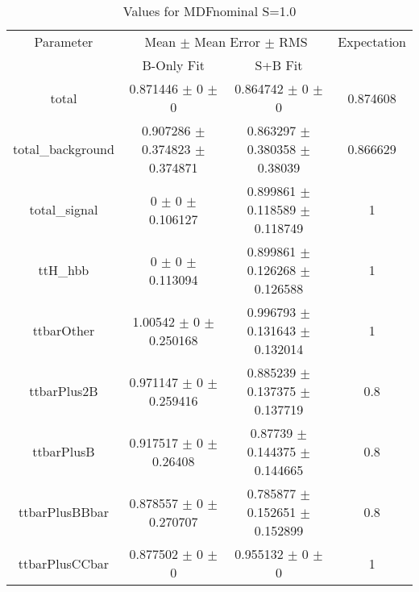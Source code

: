 \begin{table}
\centering
\caption{Values for MDFnominal S=1.0}
\begin{tabular}{cccc}
\toprule
Parameter & \multicolumn{2}{c}{Mean $\pm$ Mean Error $\pm$ RMS} & Expectation\\
 & B-Only Fit & S+B Fit & \\
\midrule
total & \num{0.871446} $\pm$ \num{0} $\pm$ \num{0} & \num{0.864742} $\pm$ \num{0} $\pm$ \num{0} & \num{0.874608}\\
total\_background & \num{0.907286} $\pm$ \num{0.374823} $\pm$ \num{0.374871} & \num{0.863297} $\pm$ \num{0.380358} $\pm$ \num{0.38039} & \num{0.866629}\\
total\_signal & \num{0} $\pm$ \num{0} $\pm$ \num{0.106127} & \num{0.899861} $\pm$ \num{0.118589} $\pm$ \num{0.118749} & \num{1}\\
ttH\_hbb & \num{0} $\pm$ \num{0} $\pm$ \num{0.113094} & \num{0.899861} $\pm$ \num{0.126268} $\pm$ \num{0.126588} & \num{1}\\
ttbarOther & \num{1.00542} $\pm$ \num{0} $\pm$ \num{0.250168} & \num{0.996793} $\pm$ \num{0.131643} $\pm$ \num{0.132014} & \num{1}\\
ttbarPlus2B & \num{0.971147} $\pm$ \num{0} $\pm$ \num{0.259416} & \num{0.885239} $\pm$ \num{0.137375} $\pm$ \num{0.137719} & \num{0.8}\\
ttbarPlusB & \num{0.917517} $\pm$ \num{0} $\pm$ \num{0.26408} & \num{0.87739} $\pm$ \num{0.144375} $\pm$ \num{0.144665} & \num{0.8}\\
ttbarPlusBBbar & \num{0.878557} $\pm$ \num{0} $\pm$ \num{0.270707} & \num{0.785877} $\pm$ \num{0.152651} $\pm$ \num{0.152899} & \num{0.8}\\
ttbarPlusCCbar & \num{0.877502} $\pm$ \num{0} $\pm$ \num{0} & \num{0.955132} $\pm$ \num{0} $\pm$ \num{0} & \num{1}\\
\bottomrule
\end{tabular}
\end{table}